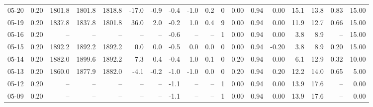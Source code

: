 \begin{threeparttable}
{\begin{tabular}{lrrrrrrrrrrrrrrrrr}
  05-20 &     0.20 & 1801.8 & 1801.8 & 1818.8 &      -17.0 &           -0.9 &                      -0.4 &                     -1.0 &                 0.2 &              0 &       0.00 &      0.94 &           0.00 &             15.1 &                13.8 &            0.83 &                  15.00 \\
  05-19 &     0.20 & 1837.8 & 1837.8 & 1801.8 &       36.0 &            2.0 &                      -0.2 &                      1.0 &                 0.4 &              9 &       0.00 &      0.94 &           0.00 &             11.9 &                12.7 &            0.66 &                  15.00 \\
  05-16 &     0.20 &     -- &     -- &     -- &         -- &             -- &                      -0.6 &                       -- &                  -- &              1 &       0.00 &      0.94 &           0.00 &              3.8 &                 8.9 &              -- &                  15.00 \\
  05-15 &     0.20 & 1892.2 & 1892.2 & 1892.2 &        0.0 &            0.0 &                      -0.5 &                      0.0 &                 0.0 &              0 &       0.00 &      0.94 &          -0.20 &              3.8 &                 8.9 &            0.20 &                  15.00 \\
  05-14 &     0.20 & 1882.0 & 1899.6 & 1892.2 &        7.3 &            0.4 &                      -0.4 &                      1.0 &                 0.1 &              0 &       0.20 &      0.94 &           0.00 &              6.1 &                12.9 &            0.32 &                  10.00 \\
  05-13 &     0.20 & 1860.0 & 1877.9 & 1882.0 &       -4.1 &           -0.2 &                      -1.0 &                     -1.0 &                 0.0 &              0 &       0.20 &      0.94 &           0.20 &             12.2 &                14.0 &            0.65 &                   5.00 \\
  05-12 &     0.20 &     -- &     -- &     -- &         -- &             -- &                      -1.1 &                       -- &                  -- &              1 &       0.00 &      0.94 &           0.00 &             13.9 &                17.6 &              -- &                   0.00 \\
  05-09 &     0.20 &     -- &     -- &     -- &         -- &             -- &                      -1.1 &                       -- &                  -- &              1 &       0.00 &      0.94 &           0.00 &             13.9 &                17.6 &              -- &                   0.00 \\

\end{tabular}}
\end{threeparttable}
